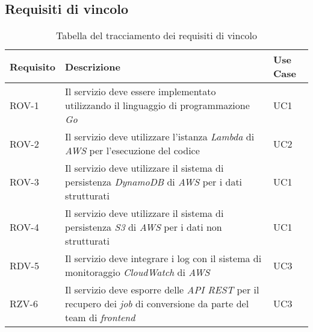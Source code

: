 \subsection{Requisiti di vincolo}
\begin{table}[H]
    \caption{Tabella del tracciamento dei requisiti di vincolo}
    \label{tab:requisiti-vincolo}
    \begin{tabularx}{\textwidth}{lXl}
        \hline\hline
        \textbf{Requisito}                                               & \textbf{Descrizione}                                & \textbf{Use Case} \\
        \hline
        ROV-1                                                            & Il servizio deve essere implementato utilizzando il
        linguaggio di programmazione \emph{Go}                           & UC1                                                                     \\
        \hline
        ROV-2                                                            & Il servizio deve utilizzare l'istanza
        \emph{Lambda} di \emph{AWS} per
        l'esecuzione del codice                                          & UC2                                                                     \\
        \hline
        ROV-3                                                            & Il servizio deve utilizzare il sistema di
        persistenza \emph{DynamoDB} di \emph{AWS} per i dati strutturati & UC1
        \\
        \hline
        ROV-4                                                            & Il servizio deve utilizzare il sistema di
        persistenza \emph{S3} di \emph{AWS} per i dati non strutturati   & UC1
        \\
        \hline
        RDV-5                                                            & Il
        servizio deve integrare i log con il sistema di monitoraggio
        \emph{CloudWatch} di \emph{AWS}                                  & UC3
        \\
        \hline
        RZV-6                                                            & Il
        servizio deve esporre delle \emph{API REST} per il recupero dei
        \emph{job} di conversione da parte del team di \emph{frontend}   & UC3                                                                     \\
        \hline
    \end{tabularx}
\end{table}%
